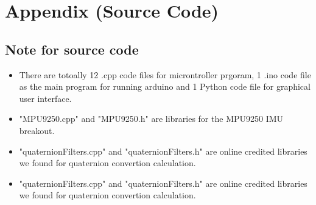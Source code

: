 \section{Appendix (Source Code)}

	\subsection{Note for source code}
	\begin{itemize}
		\item {There are totoally 12 .cpp code files for microntroller prgoram, 1 .ino code file as the main program for running arduino and 1 Python code file for graphical user interface. }
		
		\item {"MPU9250.cpp" and "MPU9250.h" are libraries for the MPU9250 IMU breakout.}

		\item {"quaternionFilters.cpp" and "quaternionFilters.h" are online credited libraries we found for quaternion convertion calculation.}

		\item {"quaternionFilters.cpp" and "quaternionFilters.h" are online credited libraries we found for quaternion convertion calculation.}
	\end{itemize}

